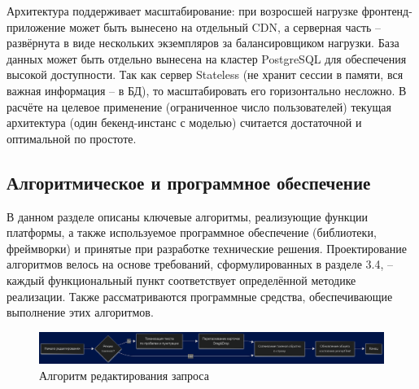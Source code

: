 Архитектура поддерживает масштабирование: при возросшей нагрузке фронтенд-приложение может быть вынесено на отдельный CDN, а серверная часть – развёрнута в виде нескольких экземпляров за балансировщиком нагрузки. База данных может быть отдельно вынесена на кластер PostgreSQL для обеспечения высокой доступности. Так как сервер Stateless (не хранит сессии в памяти, вся важная информация – в БД), то масштабировать его горизонтально несложно. В расчёте на целевое применение (ограниченное число пользователей) текущая архитектура (один бекенд-инстанс с моделью) считается достаточной и оптимальной по простоте.

\subsection{Алгоритмическое и программное обеспечение}
В данном разделе описаны ключевые алгоритмы, реализующие функции платформы, а также используемое программное обеспечение (библиотеки, фреймворки) и принятые при разработке технические решения. Проектирование алгоритмов велось на основе требований, сформулированных в разделе 3.4, – каждый функциональный пункт соответствует определённой методике реализации. Также рассматриваются программные средства, обеспечивающие выполнение этих алгоритмов.

\begin{figure}[htbp]
    \centering
    \includegraphics[width=1\textwidth]{picture/diploma-inter-algo-1.png}
    \caption{Алгоритм редактирования запроса}
    \label{algo-1}
\end{figure}


